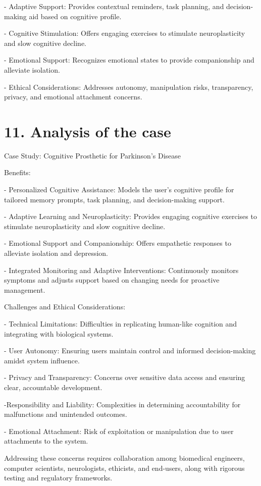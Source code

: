 \documentclass{article}
\begin{document}
- Adaptive Support: Provides contextual reminders, task planning, and decision-making aid based on cognitive profile.

- Cognitive Stimulation: Offers engaging exercises to stimulate neuroplasticity and slow cognitive decline.

- Emotional Support: Recognizes emotional states to provide companionship and alleviate isolation.

- Ethical Considerations: Addresses autonomy, manipulation risks, transparency, privacy, and emotional attachment concerns.

\section*{11. Analysis of the case}
Case Study: Cognitive Prosthetic for Parkinson’s Disease

Benefits:

- Personalized Cognitive Assistance: Models the user’s cognitive profile for tailored memory prompts, task planning, and decision-making support.

- Adaptive Learning and Neuroplasticity: Provides engaging cognitive exercises to stimulate neuroplasticity and slow cognitive decline.

- Emotional Support and Companionship: Offers empathetic responses to alleviate isolation and depression.

- Integrated Monitoring and Adaptive Interventions: Continuously monitors symptoms and adjusts support based on changing needs for proactive management.

Challenges and Ethical Considerations:

- Technical Limitations: Difficulties in replicating human-like cognition and integrating with biological systems.

- User Autonomy: Ensuring users maintain control and informed decision-making amidst system influence.

- Privacy and Transparency: Concerns over sensitive data access and ensuring clear, accountable development.

-Responsibility and Liability: Complexities in determining accountability for malfunctions and unintended outcomes.

- Emotional Attachment: Risk of exploitation or manipulation due to user attachments to the system.

Addressing these concerns requires collaboration among biomedical engineers, computer scientists, neurologists, ethicists, and end-users, along with rigorous testing and regulatory frameworks.
\end{document}
